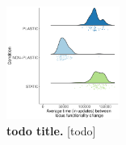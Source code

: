 \begin{figure}[ht!]
    \centering
    \includegraphics[width=0.33\textwidth]{media/architecture/avg_time_between_func_changes_weighted_mean.pdf}
    \caption{\small
        \textbf{todo title.}
        [todo]
    }
    \label{fig:architecture_locus_change_time}
\end{figure}